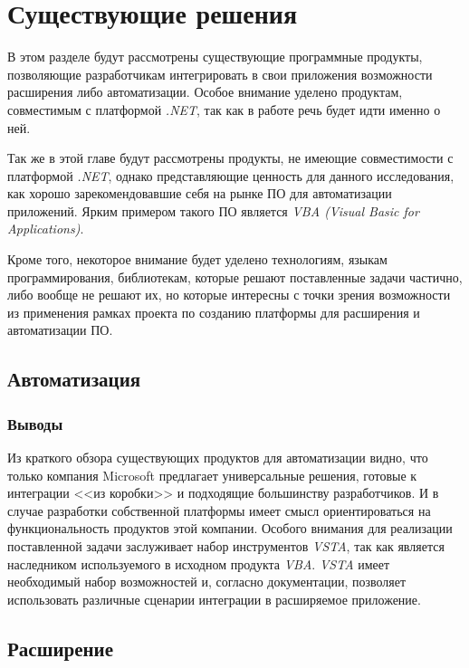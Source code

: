 \section{Существующие решения}

В этом разделе будут рассмотрены существующие программные продукты, позволяющие разработчикам интегрировать в свои приложения возможности расширения либо автоматизации. Особое внимание уделено продуктам, совместимым с платформой {\it .NET}, так как в работе речь будет идти именно о ней.

Так же в этой главе будут рассмотрены продукты, не имеющие совместимости с платформой {\it .NET}, однако представляющие ценность для данного исследования, как хорошо зарекомендовавшие себя на рынке ПО для автоматизации приложений. Ярким примером такого ПО является {\it VBA (Visual Basic for Applications)}.

Кроме того, некоторое внимание будет уделено технологиям, языкам программирования, библиотекам, которые решают поставленные задачи частично, либо вообще не решают их, но которые интересны с точки зрения возможности из применения рамках проекта по созданию платформы для расширения и автоматизации ПО.

\subsection{Автоматизация}







\subsubsection{Выводы}

Из краткого обзора существующих продуктов для автоматизации видно, что только компания Microsoft предлагает универсальные решения, готовые к интеграции <<из коробки>> и подходящие большинству разработчиков. И в случае разработки собственной платформы имеет смысл ориентироваться на функциональность продуктов этой компании. Особого внимания для реализации поставленной задачи заслуживает набор инструментов {\it VSTA}, так как является наследником используемого в исходном продукта {\it VBA}. {\it VSTA} имеет необходимый набор возможностей и, согласно документации, позволяет использовать различные сценарии интеграции в расширяемое приложение.

\subsection{Расширение}

